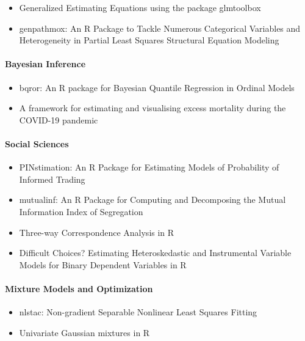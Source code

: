 \begin{itemize}
\tightlist
\item
  Generalized Estimating Equations using the package glmtoolbox
\item
  genpathmox: An R Package to Tackle Numerous Categorical Variables and Heterogeneity in Partial Least Squares Structural Equation Modeling
\end{itemize}

\hypertarget{bayesian-inference}{%
\paragraph{Bayesian Inference}\label{bayesian-inference}}

\begin{itemize}
\tightlist
\item
  bqror: An R package for Bayesian Quantile Regression in Ordinal Models
\item
  A framework for estimating and visualising excess mortality during the COVID-19 pandemic
\end{itemize}

\hypertarget{social-sciences}{%
\paragraph{Social Sciences}\label{social-sciences}}

\begin{itemize}
\tightlist
\item
  PINstimation: An R Package for Estimating Models of Probability of Informed Trading
\item
  mutualinf: An R Package for Computing and Decomposing the Mutual Information Index of Segregation
\item
  Three-way Correspondence Analysis in R
\item
  Difficult Choices? Estimating Heteroskedastic and Instrumental Variable Models for Binary Dependent Variables in R
\end{itemize}

\hypertarget{mixture-models-and-optimization}{%
\paragraph{Mixture Models and Optimization}\label{mixture-models-and-optimization}}

\begin{itemize}
\tightlist
\item
  nlstac: Non-gradient Separable Nonlinear Least Squares Fitting
\item
  Univariate Gaussian mixtures in R
\end{itemize}

